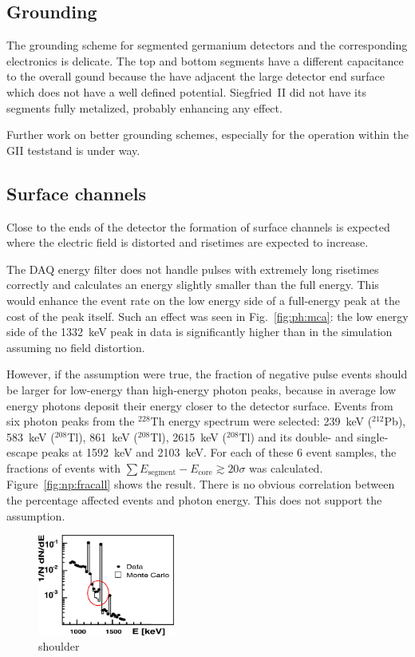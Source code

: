 \subsection{Grounding}
\label{sec:np:elec}
The grounding scheme for segmented germanium detectors and the
corresponding electronics is delicate. The top and bottom segments
have a different capacitance to the overall gound because the have
adjacent the large detector end surface which does not have a well
defined potential. Siegfried~II did not have its segments fully
metalized, probably enhancing any effect.

Further work on better grounding schemes, especially for the operation
within the GII teststand is under way.


\subsection{Surface channels}
\label{sec:np:surf}

Close to the ends of the detector the formation of surface
channels \cite{Sur05}is expected where the electric field is distorted
and risetimes are expected to increase.

The DAQ energy filter does not handle pulses with extremely long
risetimes correctly and calculates an energy slightly smaller than the
full energy.  This would enhance the event rate on the low energy side
of a full-energy peak at the cost of the peak itself. Such an effect
was seen in Fig.~\ref{fig:ph:mca}: the low energy side of the 1332~keV
peak in data is significantly higher than in the simulation assuming
no field distortion.

However, if the assumption were true, the fraction of negative pulse
events should be larger for low-energy than high-energy photon peaks,
because in average low energy photons deposit their energy closer to
the detector surface.  Events from six photon peaks from the
$^{228}$Th energy spectrum were selected: 239~keV ($^{212}$Pb),
583~keV ($^{208}$Tl), 861~keV ($^{208}$Tl), 2615~keV ($^{208}$Tl) and
its double- and single-escape peaks at 1592~keV and 2103~keV.  For
each of these 6 event samples, the fractions of events with $\sum
E_{\text{segment}} - E_{\text{core}} \gtrsim 20\sigma$ was calculated.
Figure~\ref{fig:np:fracall} shows the result. There is no obvious correlation
between the percentage affected events and photon energy. This does
not support the assumption.

\begin{figure}[tphb]
\centering
\includegraphics[width=0.4\textwidth]{dmcnew}
\caption{shoulder}
\label{fig:np:shou}
\end{figure}

